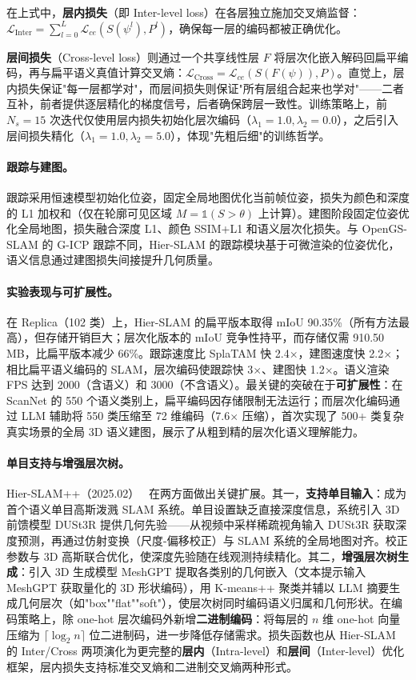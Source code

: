 在上式中，\textbf{层内损失}（即 Inter-level loss）在各层独立施加交叉熵监督：$\mathcal{L}_{\text{Inter}} = \sum_{l=0}^L \mathcal{L}_{ce}(S(\psi^l), P^l)$，确保每一层的编码都被正确优化。

\textbf{层间损失}（Cross-level loss）则通过一个共享线性层 $F$ 将层次化嵌入解码回扁平编码，再与扁平语义真值计算交叉熵：$\mathcal{L}_{\text{Cross}} = \mathcal{L}_{ce}(S(F(\psi)), P)$。直觉上，层内损失保证"每一层都学对"，而层间损失则保证"所有层组合起来也学对"——二者互补，前者提供逐层精化的梯度信号，后者确保跨层一致性。训练策略上，前 $N_s = 15$ 次迭代仅使用层内损失初始化层次编码（$\lambda_1 = 1.0, \lambda_2 = 0.0$），之后引入层间损失精化（$\lambda_1 = 1.0, \lambda_2 = 5.0$），体现"先粗后细"的训练哲学。

\paragraph{跟踪与建图。}
跟踪采用恒速模型初始化位姿，固定全局地图优化当前帧位姿，损失为颜色和深度的 L1 加权和（仅在轮廓可见区域 $M = \mathbb{1}(S > \theta)$ 上计算）。建图阶段固定位姿优化全局地图，损失融合深度 L1、颜色 SSIM+L1 和语义层次化损失。与 OpenGS-SLAM 的 G-ICP 跟踪不同，Hier-SLAM 的跟踪模块基于可微渲染的位姿优化，语义信息通过建图损失间接提升几何质量。

\paragraph{实验表现与可扩展性。}
在 Replica（102 类）上，Hier-SLAM 的扁平版本取得 mIoU 90.35\%（所有方法最高），但存储开销巨大；层次化版本的 mIoU 竞争性持平，而存储仅需 910.50 MB，比扁平版本减少 66\%。跟踪速度比 SplaTAM 快 2.4$\times$，建图速度快 2.2$\times$；相比扁平语义编码的 SLAM，层次编码使跟踪快 3$\times$、建图快 1.2$\times$。语义渲染 FPS 达到 2000（含语义）和 3000（不含语义）。最关键的突破在于\textbf{可扩展性}：在 ScanNet 的 550 个语义类别上，扁平编码因存储限制无法运行；而层次化编码通过 LLM 辅助将 550 类压缩至 72 维编码（7.6$\times$ 压缩），首次实现了 500+ 类复杂真实场景的全局 3D 语义建图，展示了从粗到精的层次化语义理解能力。

\paragraph{单目支持与增强层次树。}
Hier-SLAM++（2025.02）~\cite{2502_14931} 在两方面做出关键扩展。其一，\textbf{支持单目输入}：成为首个语义单目高斯泼溅 SLAM 系统。单目设置缺乏直接深度信息，系统引入 3D 前馈模型 DUSt3R 提供几何先验——从视频中采样稀疏视角输入 DUSt3R 获取深度预测，再通过仿射变换（尺度-偏移校正）与 SLAM 系统的全局地图对齐。校正参数与 3D 高斯联合优化，使深度先验随在线观测持续精化。其二，\textbf{增强层次树生成}：引入 3D 生成模型 MeshGPT 提取各类别的几何嵌入（文本提示输入 MeshGPT 获取量化的 3D 形状编码），用 K-means++ 聚类并辅以 LLM 摘要生成几何层次（如"box""flat""soft"），使层次树同时编码语义归属和几何形状。在编码策略上，除 one-hot 层次编码外新增\textbf{二进制编码}：将每层的 $n$ 维 one-hot 向量压缩为 $\lceil\log_2 n\rceil$ 位二进制码，进一步降低存储需求。损失函数也从 Hier-SLAM 的 Inter/Cross 两项演化为更完整的\textbf{层内}（Intra-level）和\textbf{层间}（Inter-level）优化框架，层内损失支持标准交叉熵和二进制交叉熵两种形式。

